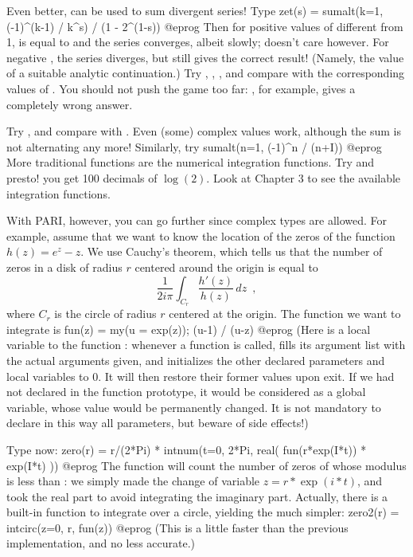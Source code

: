 Even better,  can be used to sum divergent series! Type
\bprog
  zet(s) = sumalt(k=1, (-1)^(k-1) / k^s) / (1 - 2^(1-s))
@eprog\noindent
Then for positive values of  different from 1,  is equal
to  and the series converges, albeit slowly; 
doesn't care however. For negative , the series diverges, but
 still gives the correct result! (Namely, the value of a suitable
analytic continuation.) Try , , ,
and compare with the corresponding values of . You should not push
the game too far: , for example, gives a completely wrong
answer.

Try , and compare with . Even (some) complex values
work, although the sum is not alternating any more! Similarly, try
\bprog
  sumalt(n=1, (-1)^n / (n+I))
@eprog
\medskip
More traditional functions are the numerical integration functions. Try
 and presto! you get 100 decimals of $\log(2)$. Look
at Chapter 3 to see the available integration functions.

With PARI, however, you can go further since complex types are allowed.
For example, assume that we want to know the location of the zeros of the
function $h(z)=e^z-z$. We use Cauchy's theorem, which tells us that the
number of zeros in a disk of radius $r$ centered around the origin is
equal to
$$\dfrac{1}{2i\pi}\int_{C_r}\dfrac{h'(z)}{h(z)}\,dz\enspace,$$
where $C_r$ is the circle of radius $r$ centered at the origin.
The function we want to integrate is
\bprog
  fun(z) = my(u = exp(z)); (u-1) / (u-z)
@eprog\noindent
(Here  is a local variable to the function : whenever
a function is called,  fills its argument list with the actual arguments
given, and initializes the other declared parameters and local variables to
0. It will then restore their former values upon exit. If we had not declared
 in the function prototype, it would be considered as a global
variable, whose value would be permanently changed. It is not mandatory to
declare in this way all parameters, but beware of side effects!)

Type now:
\bprog
  zero(r) = r/(2*Pi) * intnum(t=0, 2*Pi, real( fun(r*exp(I*t)) * exp(I*t) ))
@eprog
The function  will count the number of zeros of 
whose modulus is less than : we simply made the change of variable
$z = r*\exp(i*t)$, and took the real part to avoid integrating the
imaginary part. Actually, there is a built-in function 
to integrate over a circle, yielding the much simpler:
\bprog
  zero2(r) = intcirc(z=0, r, fun(z))
@eprog
(This is a little faster than the previous implementation, and no less
accurate.)

